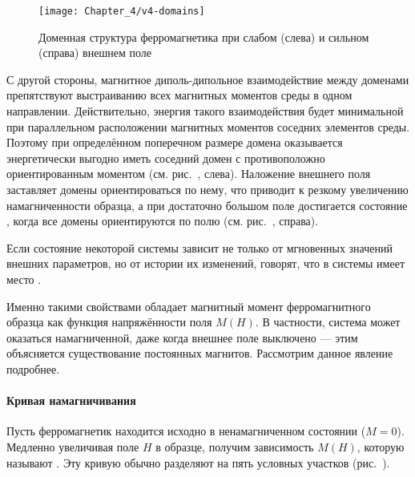 \begin{wrapfigure}[]{r}{0.4\textwidth}
    \centering\texttt{[image: Chapter\_4/v4-domains]}
    \caption{Доменная структура ферромагнетика при слабом (слева)
    и сильном (справа) внешнем поле}
\end{wrapfigure}

С другой стороны, магнитное диполь-дипольное взаимодействие между доменами препятствуют
выстраиванию всех магнитных моментов среды в одном направлении.
Действительно, энергия такого взаимодействия будет минимальной
при параллельном расположении магнитных моментов соседних элементов среды.
Поэтому при определённом поперечном размере домена оказывается
энергетически выгодно иметь соседний домен с противоположно ориентированным моментом
(см. рис.~, слева).
Наложение внешнего поля заставляет домены ориентироваться
по нему, что приводит к резкому увеличению намагниченности образца, а при
достаточно большом поле достигается состояние ,
когда все домены ориентируются по полю (см. рис.~, справа).


\label{sec:histeresis}

Если состояние некоторой системы зависит не только от мгновенных значений
внешних параметров, но от истории их изменений, говорят, что
в системы имеет место .

Именно такими свойствами обладает магнитный момент ферромагнитного образца
как функция напряжённости поля $M(H)$. В частности,
система может оказаться намагниченной, даже когда внешнее поле выключено ---
этим объясняется существование постоянных магнитов. Рассмотрим данное явление подробнее.

\paragraph{Кривая намагничивания}
Пусть ферромагнетик находится исходно в ненамагниченном состоянии
($M = 0$). Медленно увеличивая поле $H$ в образце, получим зависимость
$M(H)$, которую называют . Эту кривую обычно
разделяют на пять условных участков (рис.~).

